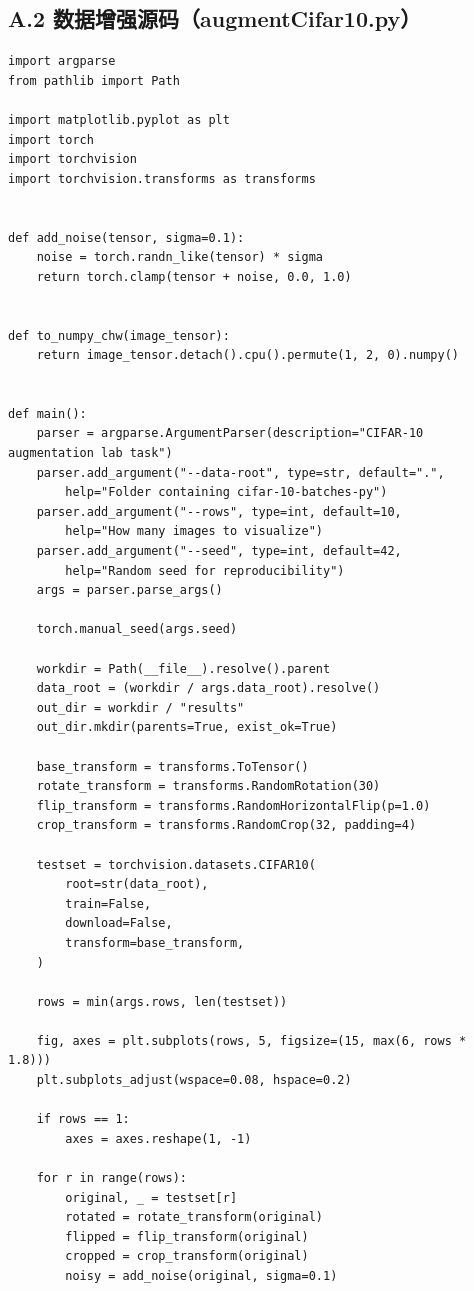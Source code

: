 \documentclass[12pt,a4paper]{ctexart}
\begin{document}
\subsection*{A.2 数据增强源码（augmentCifar10.py）}
\begin{lstlisting}
import argparse
from pathlib import Path

import matplotlib.pyplot as plt
import torch
import torchvision
import torchvision.transforms as transforms


def add_noise(tensor, sigma=0.1):
    noise = torch.randn_like(tensor) * sigma
    return torch.clamp(tensor + noise, 0.0, 1.0)


def to_numpy_chw(image_tensor):
    return image_tensor.detach().cpu().permute(1, 2, 0).numpy()


def main():
    parser = argparse.ArgumentParser(description="CIFAR-10 augmentation lab task")
    parser.add_argument("--data-root", type=str, default=".",
        help="Folder containing cifar-10-batches-py")
    parser.add_argument("--rows", type=int, default=10,
        help="How many images to visualize")
    parser.add_argument("--seed", type=int, default=42,
        help="Random seed for reproducibility")
    args = parser.parse_args()

    torch.manual_seed(args.seed)

    workdir = Path(__file__).resolve().parent
    data_root = (workdir / args.data_root).resolve()
    out_dir = workdir / "results"
    out_dir.mkdir(parents=True, exist_ok=True)

    base_transform = transforms.ToTensor()
    rotate_transform = transforms.RandomRotation(30)
    flip_transform = transforms.RandomHorizontalFlip(p=1.0)
    crop_transform = transforms.RandomCrop(32, padding=4)

    testset = torchvision.datasets.CIFAR10(
        root=str(data_root),
        train=False,
        download=False,
        transform=base_transform,
    )

    rows = min(args.rows, len(testset))

    fig, axes = plt.subplots(rows, 5, figsize=(15, max(6, rows * 1.8)))
    plt.subplots_adjust(wspace=0.08, hspace=0.2)

    if rows == 1:
        axes = axes.reshape(1, -1)

    for r in range(rows):
        original, _ = testset[r]
        rotated = rotate_transform(original)
        flipped = flip_transform(original)
        cropped = crop_transform(original)
        noisy = add_noise(original, sigma=0.1)


\end{lstlisting}
\end{document}
